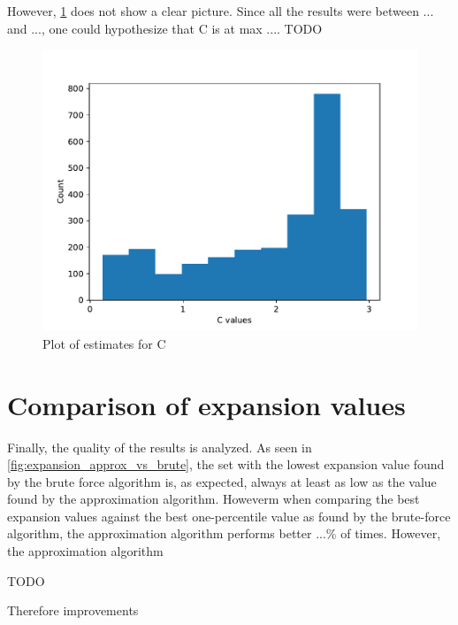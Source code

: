 However, \cref{fig:c_estimates} does not show a clear picture. Since all the results were between ... and ..., one could hypothesize that C is at max .... TODO


\begin{figure}
	\centering
	\includegraphics[scale=1]{figures/quality_evaluation_log_C_estimates.pdf}
	\caption[Plot C estimates]{Plot of estimates for C\label{fig:c_estimates}}
\end{figure}





\section{Comparison of expansion values}




Finally, the quality of the results is analyzed. As seen in \cref{fig:expansion_approx_vs_brute}, the set with the lowest expansion value found by the brute force algorithm is, as expected, always at least as low as the value found by the approximation algorithm. Howeverm when comparing the best expansion values against the best one-percentile value as found by the brute-force algorithm, the approximation algorithm performs better ...\% of times. However, the approximation algorithm



TODO

Therefore improvements

